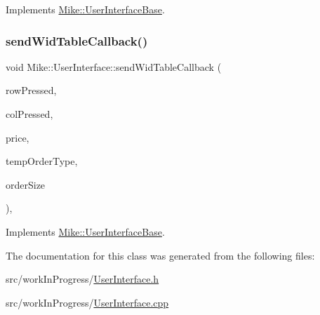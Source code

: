 Implements \hyperlink{class_mike_1_1_user_interface_base_acb35df6eb1e854e714c42f6ae473a193}{Mike\+::\+User\+Interface\+Base}.

\mbox{\label{class_mike_1_1_user_interface_a2001cad2040c95ddea43b7d43f9e82bb}} 
\subsubsection{\texorpdfstring{send\+Wid\+Table\+Callback()}{sendWidTableCallback()}}
{\footnotesize\ttfamily void Mike\+::\+User\+Interface\+::send\+Wid\+Table\+Callback (\begin{DoxyParamCaption}\item[{int}]{row\+Pressed,  }\item[{int}]{col\+Pressed,  }\item[{long}]{price,  }\item[{\hyperlink{namespace_mike_aa486aea8b1d0d07190982a311394e6cb}{Mike\+Order\+Type}}]{temp\+Order\+Type,  }\item[{int}]{order\+Size }\end{DoxyParamCaption})\hspace{0.3cm}{\ttfamily [protected]}, {\ttfamily [virtual]}}



Implements \hyperlink{class_mike_1_1_user_interface_base_a42469ffe57a8528064068a84e277ee6a}{Mike\+::\+User\+Interface\+Base}.



The documentation for this class was generated from the following files\+:\begin{DoxyCompactItemize}
\item 
src/work\+In\+Progress/\hyperlink{_user_interface_8h}{User\+Interface.\+h}\item 
src/work\+In\+Progress/\hyperlink{_user_interface_8cpp}{User\+Interface.\+cpp}\end{DoxyCompactItemize}
